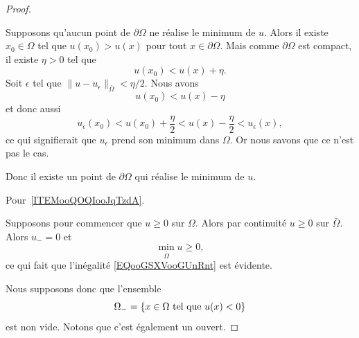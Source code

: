 \begin{proof}
\begin{subproof}
            Supposons qu'aucun point de \( \partial \Omega\) ne réalise le minimum de \( u\). Alors il existe \( x_0\in \Omega\) tel que \( u(x_0)>u(x)\) pour tout \( x\in \partial \Omega\). Mais comme \( \partial\Omega\) est compact, il existe \( \eta>0\) tel que
            \begin{equation}
                u(x_0)<u(x)+\eta.
            \end{equation}
            Soit \( \epsilon\) tel que \( \| u-u_{\epsilon} \|_{\bar \Omega}< \eta/2\). Nous avons
            \begin{equation}
                u(x_0)<u(x)-\eta
            \end{equation}
            et donc aussi
            \begin{equation}
                u_{\epsilon}(x_0)<u(x_0)+\frac{ \eta }{2}<u(x)-\frac{ \eta }{2}<u_{\epsilon}(x),
            \end{equation}
            ce qui signifierait que \( u_{\epsilon}\) prend son minimum dans \( \Omega\). Or nous savons que ce n'est pas le cas.

            Donc il existe un point de \( \partial\Omega\) qui réalise le minimum de \( u\).

    \end{subproof}

    Pour~\ref{ITEMooQOQIooJqTzdA}.

    Supposons pour commencer que \( u\geq 0\) sur \( \Omega\). Alors par continuité \( u\geq 0\) sur \( \bar \Omega\). Alors \( u_-=0\) et
    \begin{equation}
        \min_{\bar\Omega}u\geq 0,
    \end{equation}
    ce qui fait que l'inégalité \eqref{EQooGSXVooGUnRnt} est évidente.

    Nous supposons donc que l'ensemble
    \begin{equation}
        \Omega_-=\{ x\in \Omega\text{ tel que } u(x)<0 \}
    \end{equation}
    est non vide. Notons que c'est également un ouvert.


\end{proof}
